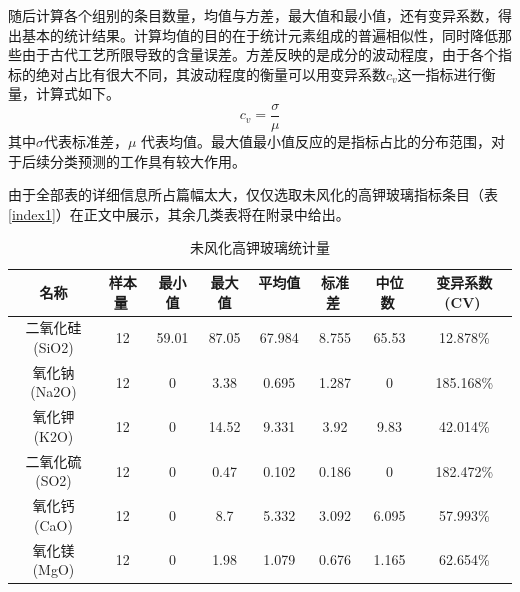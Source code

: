 \documentclass{my_paper}
\begin{document}
    随后计算各个组别的条目数量，均值与方差，最大值和最小值，还有变异系数\cite{6}，得出基本的统计结果。计算均值的目的在于统计元素组成的普遍相似性，同时降低那些由于古代工艺所限导致的含量误差。方差反映的是成分的波动程度，由于各个指标的绝对占比有很大不同，其波动程度的衡量可以用变异系数$c_v$这一指标进行衡量，计算式如下。
    \begin{equation}
    c_v = \frac{\sigma}{\mu}
    \label{cv}
    \end{equation}
    其中$ \sigma $代表标准差，$ \mu $  代表均值。最大值最小值反应的是指标占比的分布范围，对于后续分类预测的工作具有较大作用。

    由于全部表的详细信息所占篇幅太大，仅仅选取未风化的高钾玻璃指标条目（表\ref{index1}）在正文中展示，其余几类表将在附录中给出。
    \begin{table}[ht]
    \centering
    \caption{未风化高钾玻璃统计量}
    \begin{tabular}{cccccccc}
    \toprule
    名称                   & 样本量                 & 最小值                  & 最大值                  & 平均值                 & 标准差                 & 中位数                 & 变异系数(CV)            \\
    \midrule
二氧化硅(SiO2)           & 12                   & 59.01                & 87.05                & 67.984               & 8.755                & 65.53                & 12.878\%             \\
氧化钠(Na2O)            & 12                   & 0                    & 3.38                 & 0.695                & 1.287                & 0                    & 185.168\%            \\
氧化钾(K2O)             & 12                   & 0                    & 14.52                & 9.331                & 3.92                 & 9.83                 & 42.014\%             \\
二氧化硫(SO2)            & 12                   & 0                    & 0.47                 & 0.102                & 0.186                & 0                    & 182.472\%            \\
氧化钙(CaO)             & 12                   & 0                    & 8.7                  & 5.332                & 3.092                & 6.095                & 57.993\%             \\
氧化镁(MgO)             & 12                   & 0                    & 1.98                 & 1.079                & 0.676                & 1.165                & 62.654\%             \\

\end{tabular}
\end{table}
\end{document}
